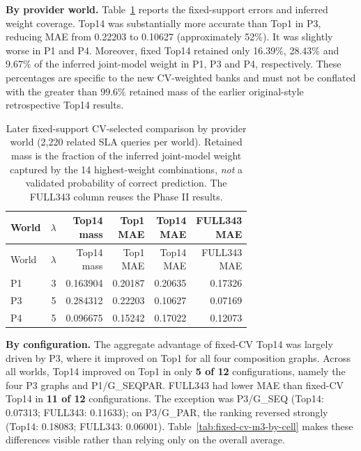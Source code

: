 \documentclass[10pt,a4paper]{article}
\begin{document}
\textbf{By provider world.} Table~\ref{tab:fixed-cv-m3-by-world} reports the fixed-support errors and inferred weight coverage. Top14 was substantially more accurate than Top1 in P3, reducing MAE from 0.22203 to 0.10627 (approximately 52\%). It was slightly worse in P1 and P4. Moreover, fixed Top14 retained only 16.39\%, 28.43\% and 9.67\% of the inferred joint-model weight in P1, P3 and P4, respectively. These percentages are specific to the new CV-weighted banks and must not be conflated with the greater than 99.6\% retained mass of the earlier original-style retrospective Top14 results.

\begingroup\footnotesize\setlength{\tabcolsep}{4pt}
\begin{longtable}{@{}p{}rrrrr@{}}
\caption{Later fixed-support CV-selected comparison by provider world (2,220 related SLA queries per world). Retained mass is the fraction of the inferred joint-model weight captured by the 14 highest-weight combinations, \emph{not} a validated probability of correct prediction. The FULL343 column reuses the Phase II results.}\label{tab:fixed-cv-m3-by-world}\\
\toprule
World & $\lambda$ & \shortstack{Top14\\mass} & \shortstack{Top1\\MAE} & \shortstack{Top14\\MAE} & \shortstack{FULL343\\MAE} \\
\midrule\endfirsthead
\toprule
World & $\lambda$ & \shortstack{Top14\\mass} & \shortstack{Top1\\MAE} & \shortstack{Top14\\MAE} & \shortstack{FULL343\\MAE} \\
\midrule\endhead
P1 & 3 & 0.163904 & 0.20187 & 0.20635 & 0.17326 \\
P3 & 5 & 0.284312 & 0.22203 & 0.10627 & 0.07169 \\
P4 & 5 & 0.096675 & 0.15242 & 0.17022 & 0.12073 \\
\bottomrule
\end{longtable}\endgroup

\textbf{By configuration.} The aggregate advantage of fixed-CV Top14 was largely driven by P3, where it improved on Top1 for all four composition graphs. Across all worlds, Top14 improved on Top1 in only \textbf{5 of 12} configurations, namely the four P3 graphs and P1/G\_SEQPAR. FULL343 had lower MAE than fixed-CV Top14 in \textbf{11 of 12} configurations. The exception was P3/G\_SEQ (Top14: 0.07313; FULL343: 0.11633); on P3/G\_PAR, the ranking reversed strongly (Top14: 0.18083; FULL343: 0.06001). Table~\ref{tab:fixed-cv-m3-by-cell} makes these differences visible rather than relying only on the overall average.
\end{document}
